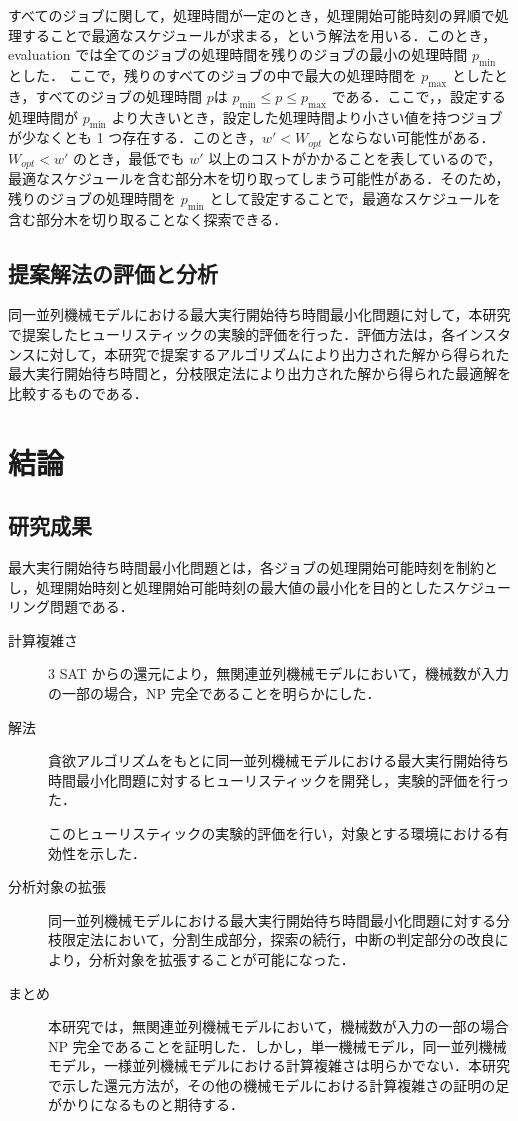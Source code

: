 \documentclass[12pt]{optlab-bachelor}
\begin{document}
すべてのジョブに関して，処理時間が一定のとき，処理開始可能時刻の昇順で処理することで最適なスケジュールが求まる，という解法を用いる．このとき，{\sc evaluation} では全てのジョブの処理時間を残りのジョブの最小の処理時間 $p_{\min}$ とした．
ここで，残りのすべてのジョブの中で最大の処理時間を $p_{\max}$ としたとき，すべてのジョブの処理時間 $p$は $p_{\min} \le p \le p_{\max}$ である．ここで，，設定する処理時間が $p_{\min}$ より大きいとき，設定した処理時間より小さい値を持つジョブが少なくとも 1 つ存在する．このとき，$w' < W_{opt}$ とならない可能性がある．$W_{opt} < w'$ のとき，最低でも $w'$ 以上のコストがかかることを表しているので，最適なスケジュールを含む部分木を切り取ってしまう可能性がある．そのため，残りのジョブの処理時間を $p_{\min}$ として設定することで，最適なスケジュールを含む部分木を切り取ることなく探索できる．

\section{提案解法の評価と分析}
同一並列機械モデルにおける最大実行開始待ち時間最小化問題に対して，本研究で提案したヒューリスティックの実験的評価を行った．評価方法は，各インスタンスに対して，本研究で提案するアルゴリズムにより出力された解から得られた最大実行開始待ち時間と，分枝限定法により出力された解から得られた最適解を比較するものである．


\chapter{結論}\label{c_6}
\section{研究成果}
最大実行開始待ち時間最小化問題とは，各ジョブの処理開始可能時刻を制約とし，処理開始時刻と処理開始可能時刻の最大値の最小化を目的としたスケジューリング問題である．

\begin{description}
  \item[計算複雑さ ] 3 SAT からの還元により，無関連並列機械モデルにおいて，機械数が入力の一部の場合，NP 完全であることを明らかにした．

  \item[解法 ] 貪欲アルゴリズムをもとに同一並列機械モデルにおける最大実行開始待ち時間最小化問題に対するヒューリスティックを開発し，実験的評価を行った．

  このヒューリスティックの実験的評価を行い，対象とする環境における有効性を示した．

  \item[分析対象の拡張 ] 同一並列機械モデルにおける最大実行開始待ち時間最小化問題に対する分枝限定法において，分割生成部分，探索の続行，中断の判定部分の改良により，分析対象を拡張することが可能になった．

  \item[まとめ ] 本研究では，無関連並列機械モデルにおいて，機械数が入力の一部の場合 NP 完全であることを証明した．しかし，単一機械モデル，同一並列機械モデル，一様並列機械モデルにおける計算複雑さは明らかでない．本研究で示した還元方法が，その他の機械モデルにおける計算複雑さの証明の足がかりになるものと期待する．
\end{description}
\end{document}
